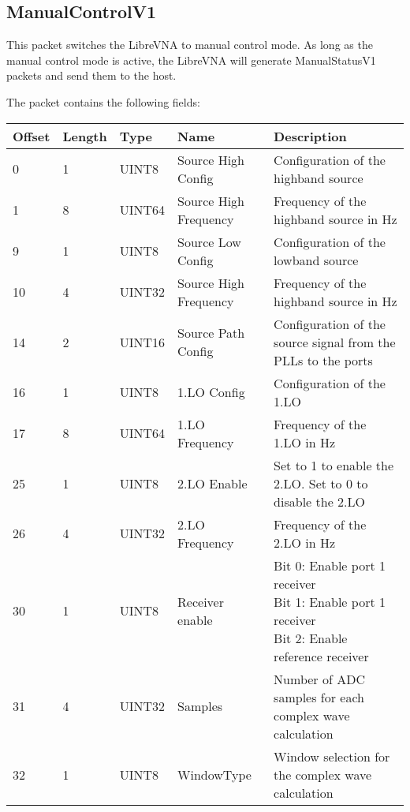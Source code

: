 \documentclass[a4paper,11pt]{article}
\begin{document}
\subsection{ManualControlV1}
This packet switches the LibreVNA to manual control mode. As long as the manual control mode is active, the LibreVNA will generate ManualStatusV1 packets and send them to the host.

The packet contains the following fields:
\begin{ThreePartTable}
\setlength\tabcolsep{3pt}

\begin{longtable}{p{} |  p{}  |  p{}| p{} | p{}}
\toprule
\textbf{Offset} &\textbf{Length} &\textbf{Type} & \textbf{Name} &\textbf{Description} \\ 
\hline
\endhead
\midrule[\heavyrulewidth]
\endfoot  
\midrule[\heavyrulewidth]
\endlastfoot

0 & 1 & UINT8 & Source High Config & Configuration of the highband source \\
1 & 8 & UINT64 & Source High Frequency & Frequency of the highband source in Hz \\
9 & 1 & UINT8 & Source Low Config & Configuration of the lowband source \\
10 & 4 & UINT32 & Source High Frequency & Frequency of the highband source in Hz \\
14 & 2 & UINT16 & Source Path Config & Configuration of the source signal from the PLLs to the ports \\
16 & 1 & UINT8 & 1.LO Config & Configuration of the 1.LO \\
17 & 8 & UINT64 & 1.LO Frequency & Frequency of the 1.LO in Hz \\
25 & 1 & UINT8 & 2.LO Enable & Set to 1 to enable the 2.LO. Set to 0 to disable the 2.LO \\
26 & 4 & UINT32 & 2.LO Frequency & Frequency of the 2.LO in Hz \\
\hline
30 & 1 & UINT8 & Receiver enable & \makecell[l]{Bit 0: Enable port 1 receiver\\Bit 1: Enable port 1 receiver\\Bit 2: Enable reference receiver} \\
\hline
31 & 4 & UINT32 & Samples & Number of ADC samples for each complex wave calculation \\
32 & 1 & UINT8 & WindowType & Window selection for the complex wave calculation \\
\end{longtable}   
\end{ThreePartTable}
\end{document}
